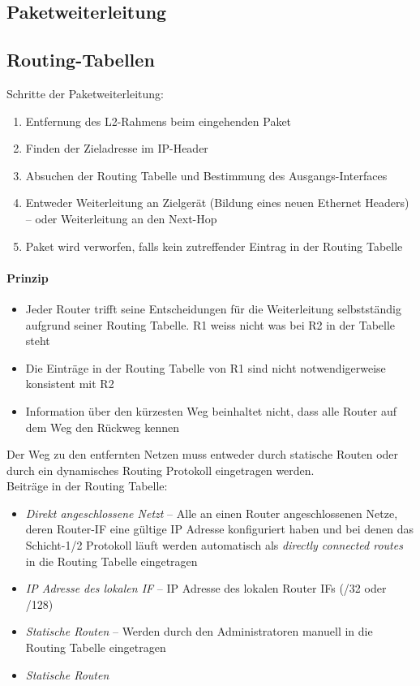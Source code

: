 \documentclass[a4paper,12pt]{article}
\begin{document}
\subsection{Paketweiterleitung}

\subsection{Routing-Tabellen}
Schritte der Paketweiterleitung:
\begin{enumerate}
\item Entfernung des L2-Rahmens beim eingehenden Paket
\item Finden der Zieladresse im IP-Header
\item Absuchen der Routing Tabelle und Bestimmung des Ausgangs-Interfaces
\item Entweder Weiterleitung an Zielgerät (Bildung eines neuen Ethernet Headers) -- oder Weiterleitung an den Next-Hop
\item Paket wird verworfen, falls kein zutreffender Eintrag in der Routing Tabelle
\end{enumerate}


\paragraph{Prinzip}
\begin{itemize}
\item Jeder Router trifft seine Entscheidungen für die Weiterleitung selbstständig aufgrund seiner Routing Tabelle. R1 weiss nicht was bei R2 in der Tabelle steht
\item Die Einträge in der Routing Tabelle von R1 sind nicht notwendigerweise konsistent mit R2
\item Information über den kürzesten Weg beinhaltet nicht, dass alle Router auf dem Weg den Rückweg kennen
\end{itemize}

Der Weg zu den entfernten Netzen muss entweder durch statische Routen oder durch ein dynamisches Routing Protokoll eingetragen werden.\\

Beiträge in der Routing Tabelle:
\begin{itemize}
\item \emph{Direkt angeschlossene Netzt} -- Alle an einen Router angeschlossenen Netze, deren Router-IF eine gültige IP Adresse konfiguriert haben und bei denen das Schicht-1/2 Protokoll läuft werden automatisch als \emph{directly connected routes} in die Routing Tabelle eingetragen
\item \emph{IP Adresse des lokalen IF} -- IP Adresse des lokalen Router IFs (/32 oder /128)\
\item \emph{Statische Routen} -- Werden durch den Administratoren manuell in die Routing Tabelle eingetragen
\item \emph{Statische Routen}
\end{itemize}
\end{document}
